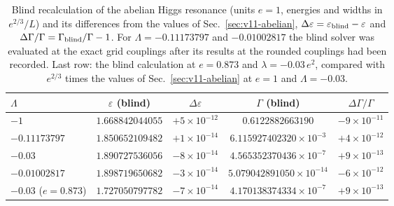 \begin{table}[t]
\centering
\small
\caption{Blind recalculation of the abelian Higgs resonance (units $e=1$, energies and widths in $e^{2/3}/L$) and its differences from the values of Sec.~\ref{sec:v11-abelian}, $\Delta\varepsilon=\varepsilon_{\rm blind}-\varepsilon$ and $\Delta\Gamma/\Gamma=\Gamma_{\rm blind}/\Gamma-1$. For $\Lambda=-0.11173797$ and $-0.01002817$ the blind solver was evaluated at the exact grid couplings after its results at the rounded couplings had been recorded. Last row: the blind calculation at $e=0.873$ and $\lambda=-0.03\,e^2$, compared with $e^{2/3}$ times the values of Sec.~\ref{sec:v11-abelian} at $e=1$ and $\Lambda=-0.03$.}
\label{tab:v11-blind-abelian}
\begin{tabular}{@{}lcccc@{}}
\toprule
$\Lambda$ & $\varepsilon$ (blind) & $\Delta\varepsilon$ & $\Gamma$ (blind) & $\Delta\Gamma/\Gamma$ \\
\midrule
$-1$ & $1.668842044055$ & $+5\times10^{-12}$ & $0.6122882663190$ & $-9\times10^{-11}$ \\ %
$-0.11173797$ & $1.850652109482$ & $+1\times10^{-14}$ & $6.115927402320\times10^{-3}$ & $+4\times10^{-12}$ \\ %
$-0.03$ & $1.890727536056$ & $-8\times10^{-14}$ & $4.565352370436\times10^{-7}$ & $+9\times10^{-13}$ \\ %
$-0.01002817$ & $1.898719650682$ & $-3\times10^{-14}$ & $5.079042891050\times10^{-14}$ & $-6\times10^{-12}$ \\ %
$-0.03$ ($e=0.873$) & $1.727050797782$ & $-7\times10^{-14}$ & $4.170138374334\times10^{-7}$ & $+9\times10^{-13}$ \\ %
\bottomrule
\end{tabular}
\end{table}
